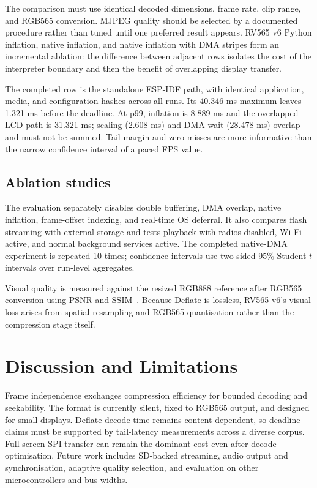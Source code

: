 \documentclass[11pt,twocolumn]{article}
\begin{document}
The comparison must use identical decoded dimensions, frame rate, clip range,
and RGB565 conversion.  MJPEG quality should be selected by a documented
procedure rather than tuned until one preferred result appears.  RV565 v6
Python inflation, native inflation, and native inflation with DMA stripes form
an incremental ablation: the difference between adjacent rows isolates the
cost of the interpreter boundary and then the benefit of overlapping display
transfer.

The completed row is the standalone ESP-IDF path, with identical application,
media, and configuration hashes across all runs.  Its 40.346 ms maximum leaves
1.321 ms before the deadline.  At p99, inflation is 8.889 ms and the overlapped
LCD path is 31.321 ms; scaling (2.608 ms) and DMA wait (28.478 ms) overlap and
must not be summed.  Tail margin and zero misses are more informative than the
narrow confidence interval of a paced FPS value.

\subsection{Ablation studies}

The evaluation separately disables double buffering, DMA overlap, native
inflation, frame-offset indexing, and real-time OS deferral.  It also compares
flash streaming with external storage and tests playback with radios disabled,
Wi-Fi active, and normal background services active.  The completed native-DMA
experiment is repeated 10 times; confidence intervals use two-sided 95\%
Student-$t$ intervals over run-level aggregates.

Visual quality is measured against the resized RGB888 reference after RGB565
conversion using PSNR and SSIM~\cite{wang2004image}.  Because Deflate is lossless, RV565 v6's visual
loss arises from spatial resampling and RGB565 quantisation rather than the
compression stage itself.

\section{Discussion and Limitations}

Frame independence exchanges compression efficiency for bounded decoding and
seekability.  The format is currently silent, fixed to RGB565 output, and
designed for small displays.  Deflate decode time remains content-dependent,
so deadline claims must be supported by tail-latency measurements across a
diverse corpus.  Full-screen SPI transfer can remain the dominant cost even
after decode optimisation.  Future work includes SD-backed streaming, audio
output and synchronisation, adaptive quality selection, and evaluation on
other microcontrollers and bus widths.
\end{document}
